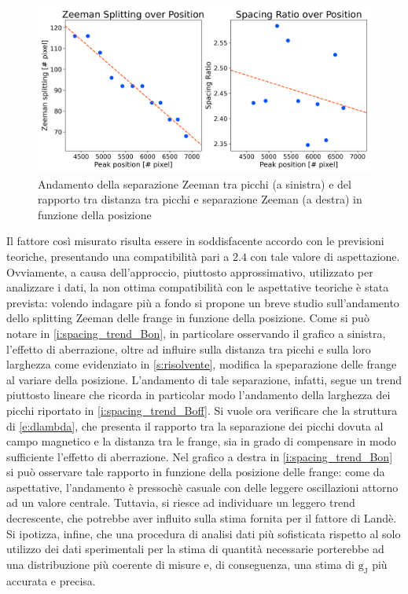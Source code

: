 \documentclass[twocolumn,10pt]{asme2ej}
\begin{document}
\begin{figure}
    \centering
    \includegraphics[width=\linewidth]{../Plots/Bon_zeeman_trend.png}
    \caption{Andamento della separazione Zeeman tra picchi (a sinistra) e del rapporto tra distanza tra picchi e separazione Zeeman (a destra) in funzione della posizione}
    \label{i:spacing_trend_Bon}
    \vspace{-20pt}
\end{figure}

Il fattore così misurato risulta essere in soddisfacente accordo con le previsioni teoriche, presentando una
compatibilità pari a $2.4$ con tale valore di aspettazione. Ovviamente, a causa dell'approccio, piuttosto
approssimativo, utilizzato per analizzare i dati, la non ottima compatibilità con le aspettative teoriche è stata
prevista: volendo indagare più a fondo si propone un breve studio sull'andamento dello splitting Zeeman delle frange in
funzione della posizione. Come si può notare in \autoref{i:spacing_trend_Bon}, in particolare osservando il grafico a
sinistra, l'effetto di aberrazione, oltre ad influire sulla distanza tra picchi e sulla loro larghezza come evidenziato
in \autoref{s:risolvente}, modifica la speparazione delle frange al variare della posizione. L'andamento di tale
separazione, infatti, segue un trend piuttosto lineare che ricorda in particolar modo l'andamento della larghezza dei
picchi riportato in \autoref{i:spacing_trend_Boff}. Si vuole ora verificare che la struttura di \autoref{e:dlambda}, che
presenta il rapporto tra la separazione dei picchi dovuta al campo magnetico e la distanza tra le frange, sia in grado
di compensare in modo sufficiente l'effetto di aberrazione. Nel grafico a destra in \autoref{i:spacing_trend_Bon} si può
osservare tale rapporto in funzione della posizione delle frange: come da aspettative, l'andamento è pressochè casuale
con delle leggere oscillazioni attorno ad un valore centrale. Tuttavia, si riesce ad individuare un leggero trend
decrescente, che potrebbe aver influito sulla stima fornita per il fattore di Landè. Si ipotizza, infine, che una
procedura di analisi dati più sofisticata rispetto al solo utilizzo dei dati sperimentali per la stima di quantità
necessarie porterebbe ad una distribuzione più coerente di misure e, di conseguenza, una stima di $ \text{g}_{\text{J}}$
più accurata e precisa.
\end{document}
